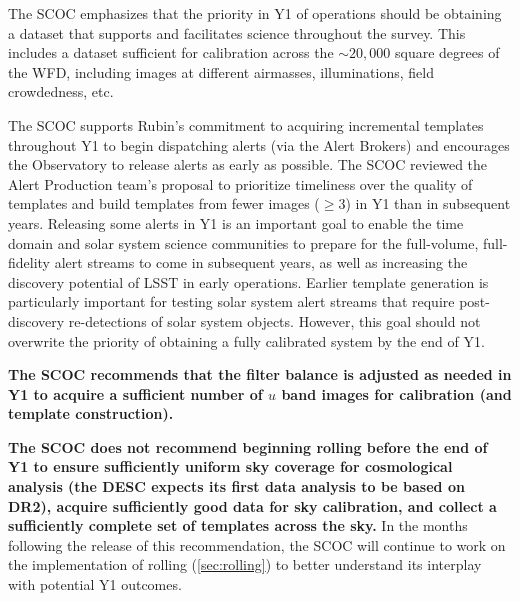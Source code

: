  The SCOC emphasizes that the priority in Y1 of operations should be obtaining a dataset that supports and facilitates science throughout the survey. This includes a dataset sufficient for calibration across the $\sim 20,000$ square degrees of the WFD, including images at different airmasses, illuminations, field crowdedness, etc. 
 
 The SCOC supports Rubin's commitment to acquiring incremental templates throughout Y1 to begin dispatching alerts (via the Alert Brokers) and encourages the Observatory to release alerts as early as possible. The SCOC reviewed the Alert Production team's proposal to prioritize timeliness over the quality of templates and build templates from fewer images ($\geq 3$) in Y1 than in subsequent years. Releasing some alerts in Y1 is an important goal to enable the time domain and solar system science communities to prepare for the full-volume, full-fidelity alert streams to come in subsequent years, as well as increasing the discovery potential of LSST in early operations. Earlier template generation is particularly important for testing solar system alert streams that require post-discovery re-detections of solar system objects.
 However, this goal should not overwrite the priority of obtaining a fully calibrated system by the end of Y1.

 {\bf The SCOC recommends that the filter balance is adjusted as needed in Y1 to acquire a sufficient number of $u$ band images for calibration (and template construction). }

 {\bf The SCOC does not recommend beginning rolling before the end of Y1 to ensure sufficiently uniform sky coverage for cosmological analysis (the DESC expects its first data analysis to be based on DR2), acquire sufficiently good data for sky calibration, and collect a 
 sufficiently complete set of templates across the sky.} In the months following the release of this recommendation, the SCOC will continue to work on the implementation of rolling (\autoref{sec:rolling}) to better understand its interplay with potential Y1 outcomes. 


\FloatBarrier



